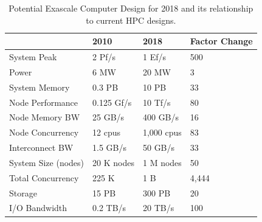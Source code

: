 \begin{table}[!htb]
    \centering
    \caption{Potential Exascale Computer Design for 2018 and its relationship to current HPC designs.}
    \begin{tabular}{ABCD}
        \toprule
        & \bf \small 2010 & \bf \small 2018 & \bf \small Factor Change \\
        \midrule
        \small System Peak         & \small 2 Pf/s     & \small 1 Ef/s     & \small 500   \\
        \small Power               & \small 6 MW       & \small 20 MW      & \small 3     \\
        \small System Memory       & \small 0.3 PB     & \small 10 PB      & \small 33    \\
        \small Node Performance    & \small 0.125 Gf/s & \small 10 Tf/s    & \small 80    \\
        \small Node Memory BW      & \small 25 GB/s    & \small 400 GB/s   & \small 16    \\
        \small Node Concurrency    & \small 12 cpus    & \small 1,000 cpus & \small 83    \\
        \small Interconnect BW     & \small 1.5 GB/s   & \small 50 GB/s    & \small 33    \\
        \small System Size (nodes) & \small 20 K nodes & \small 1 M nodes  & \small 50    \\
        \small Total Concurrency   & \small 225 K      & \small 1 B        & \small 4,444 \\
        \small Storage             & \small 15 PB      & \small 300 PB     & \small 20    \\
        \small I/O Bandwidth       & \small 0.2 TB/s   & \small 20 TB/s    & \small 100   \\
        \bottomrule
    \end{tabular}
    \label{table: hpc-trend}
\end{table}

